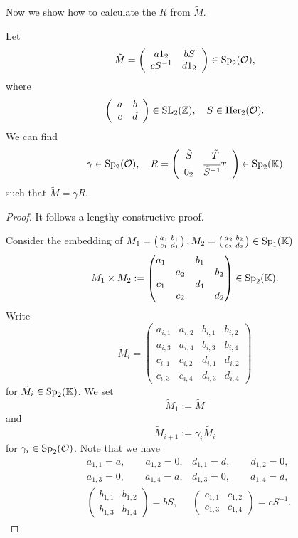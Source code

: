 Now we show how to calculate the $R$ from $\tilde{M}$.
\begin{lemma}[$solveR$]
\label{lemma:solveR}
\label{solveR}
\label{impl:solveR}
Let
\[ \tilde{M} = \left( \begin{array}{cc} a 1_2 & b S \\ c S^{-1} & d 1_2 \end{array} \right) \in \operatorname{Sp}_2(\mathcal{O}) , \]
where
\[ \left( \begin{array}{cc} a & b \\ c & d \end{array} \right) \in \operatorname{SL}_2(\mathbb{Z}), \quad S \in \operatorname{Her}_2(\mathcal{O}) . \]
We can find
\[ \gamma \in \operatorname{Sp}_2(\mathcal{O}), \quad R = \left( \begin{array}{cc} \tilde{S} & \tilde{T} \\ 0_2 & \overline{\tilde{S}^{-1}}^T \end{array} \right) \in \operatorname{Sp}_2(\mathbb{K}) \]
such that $\tilde{M} = \gamma R$.
\begin{proof}
It follows a lengthy constructive proof.

Consider the embedding of $M_1 = \left( \begin{smallmatrix} a_1 & b_1 \\ c_1 & d_1 \end{smallmatrix} \right), M_2 = \left( \begin{smallmatrix} a_2 & b_2 \\ c_2 & d_2 \end{smallmatrix} \right) \in \operatorname{Sp}_1(\mathbb{K})$
\[ M_1 \times M_2 := \begin{pmatrix}
a_1 & & b_1 & \\
& a_2 & & b_2 \\
c_1 & & d_1 & \\
& c_2 & & d_2
\end{pmatrix} \in \operatorname{Sp}_2(\mathbb{K}). \]
Write
\[ \tilde{M}_i = \begin{pmatrix}
a_{i,1} & a_{i,2} & b_{i,1} & b_{i,2} \\
a_{i,3} & a_{i,4} & b_{i,3} & b_{i,4} \\
c_{i,1} & c_{i,2} & d_{i,1} & d_{i,2} \\
c_{i,3} & c_{i,4} & d_{i,3} & d_{i,4}
\end{pmatrix} \]
for $\tilde{M}_i \in \operatorname{Sp}_2(\mathbb{K})$.
We set
\[ \tilde{M}_1 := \tilde{M} \]
and
\[ \tilde{M}_{i+1} := \gamma_i \tilde{M_i} \]
for $\gamma_i \in \operatorname{Sp}_2(\mathcal{O})$.
Note that we have
\begin{align*}
&a_{1,1} = a, \quad \quad a_{1,2} = 0,
&d_{1,1} = d, \quad \quad d_{1,2} = 0, \\
&a_{1,3} = 0, \quad \quad a_{1,4} = a,
&d_{1,3} = 0, \quad \quad d_{1,4} = d, \\
&\begin{pmatrix}
b_{1,1} & b_{1,2} \\
b_{1,3} & b_{1,4}
\end{pmatrix} = bS ,
& \begin{pmatrix}
c_{1,1} & c_{1,2} \\
c_{1,3} & c_{1,4}
\end{pmatrix} = cS^{-1} .
\end{align*}


\end{proof}
\end{lemma}
